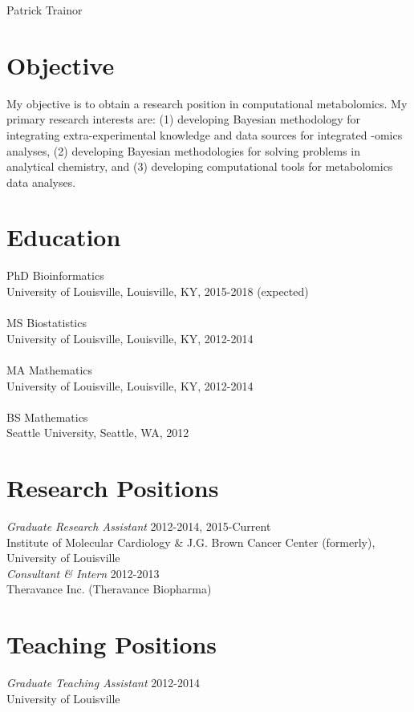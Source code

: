 \begin{center}
Patrick Trainor 
\end{center}
\begin{DoubleSpace*}
{\parindent0pt
\section*{Objective}
My objective is to obtain a research position in computational metabolomics. My primary research interests are: (1) developing Bayesian methodology for integrating extra-experimental knowledge and data sources for integrated -omics analyses, (2) developing Bayesian methodologies for solving problems in analytical chemistry, and (3) developing computational tools for metabolomics data analyses.  

\section*{Education}
 PhD Bioinformatics  \\
University of Louisville, Louisville, KY, 2015-2018 (expected)  \\ \\
 MS Biostatistics  \\
University of Louisville, Louisville, KY, 2012-2014  \\ \\
MA Mathematics  \\
University of Louisville, Louisville, KY, 2012-2014 \\ \\
BS Mathematics  \\
Seattle University, Seattle, WA, 2012

\section*{Research Positions}
\emph{Graduate Research Assistant} \hfill 2012-2014, 2015-Current \\
Institute of Molecular Cardiology \& J.G. Brown Cancer Center (formerly), University of Louisville \\

\emph{Consultant \& Intern} \hfill 2012-2013 \\
Theravance Inc. (Theravance Biopharma) 

\section*{Teaching Positions}
\emph{Graduate Teaching Assistant} \hfill 2012-2014 \\
University of Louisville \\

}
\end{DoubleSpace*}
